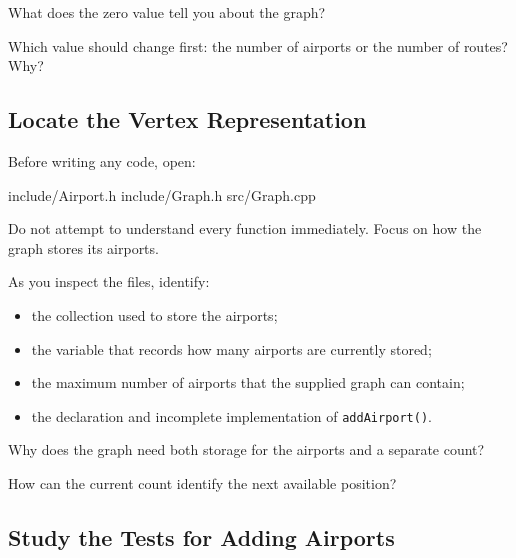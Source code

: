\documentclass{csc2059practical}
\begin{document}
\begin{reflectionbox}
What does the zero value tell you about the graph?

Which value should change first: the number of airports or the number of routes?
Why?
\end{reflectionbox}


\subsection{Locate the Vertex Representation}

Before writing any code, open:

\begin{terminal}
include/Airport.h
include/Graph.h
src/Graph.cpp
\end{terminal}

Do not attempt to understand every function immediately. Focus on how the graph
stores its airports.

As you inspect the files, identify:

\begin{itemize}
\item the collection used to store the airports;
\item the variable that records how many airports are currently stored;
\item the maximum number of airports that the supplied graph can contain;
\item the declaration and incomplete implementation of
\texttt{addAirport()}.
\end{itemize}

\begin{reflectionbox}
Why does the graph need both storage for the airports and a separate count?

How can the current count identify the next available position?
\end{reflectionbox}


\subsection{Study the Tests for Adding Airports}
\end{document}

